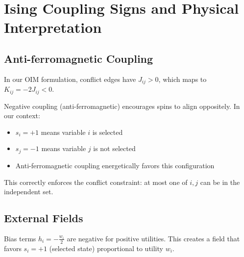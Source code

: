 \chapter{Ising Coupling Signs and Physical Interpretation}
\label{app:ising-signs}

\section{Anti-ferromagnetic Coupling}

In our OIM formulation, conflict edges have $J_{ij} > 0$, which maps to $K_{ij} = -2 J_{ij} < 0$.

Negative coupling (anti-ferromagnetic) encourages spins to align oppositely. In our context:
\begin{itemize}
\item $s_i = +1$ means variable $i$ is selected
\item $s_j = -1$ means variable $j$ is not selected
\item Anti-ferromagnetic coupling energetically favors this configuration
\end{itemize}

This correctly enforces the conflict constraint: at most one of $i, j$ can be in the independent set.

\section{External Fields}

Bias terms $h_i = -\frac{w_i}{2}$ are negative for positive utilities. This creates a field that favors $s_i = +1$ (selected state) proportional to utility $w_i$.

